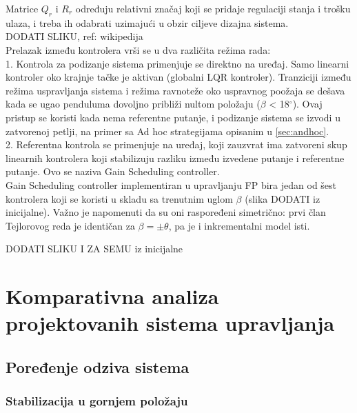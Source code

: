 \documentclass[a4paper,11pt]{article}
\theoremstyle{definition} \newtheorem{deff}{Definicija}[section]
\theoremstyle{definition} \newtheorem{prim}[deff]{Primer}
\theoremstyle{plain} \newtheorem{teor}[deff]{Teorema}
\begin{document}
	Matrice $Q_r$ i $R_r$ određuju relativni značaj koji se pridaje regulaciji stanja i trošku ulaza, i treba ih odabrati uzimajući u obzir ciljeve dizajna sistema.\\
	
	DODATI SLIKU, ref: wikipedija \\
	
	
	Prelazak između kontrolera vrši se u dva različita režima rada: \\
	
	1. Kontrola za podizanje sistema primenjuje se direktno na uređaj. Samo linearni kontroler oko krajnje tačke je aktivan (globalni LQR kontroler). Tranziciji između režima uspravljanja sistema i režima ravnoteže oko uspravnog poožaja se dešava kada se ugao penduluma dovoljno približi nultom položaju ($\beta$ < 18$^\circ$). Ovaj pristup se koristi kada nema referentne putanje, i podizanje sistema se izvodi u zatvorenoj petlji, na primer sa Ad hoc strategijama opisanim u \ref{sec:andhoc}. \\
	
	2. Referentna kontrola se primenjuje na uređaj, koji zauzvrat ima zatvoreni skup linearnih kontrolera koji stabilizuju razliku između izvedene putanje i referentne putanje. Ovo se naziva Gain Scheduling controller.\\
	
	Gain Scheduling controller implementiran u upravljanju FP bira jedan od šest kontrolera koji se koristi u skladu sa trenutnim uglom $\beta$ (slika DODATI iz inicijalne). Važno je napomenuti da su oni raspoređeni simetrično: prvi član Tejlorovog reda je identičan za $\beta = \pm \theta$, pa je i inkrementalni model isti. 
	
	DODATI SLIKU I ZA SEMU iz inicijalne
	
	
	\newpage
	
	\section{Komparativna analiza projektovanih sistema upravljanja}
	
	\subsection{Poređenje odziva sistema}
	\subsubsection{Stabilizacija u gornjem položaju}
	
\end{document}
